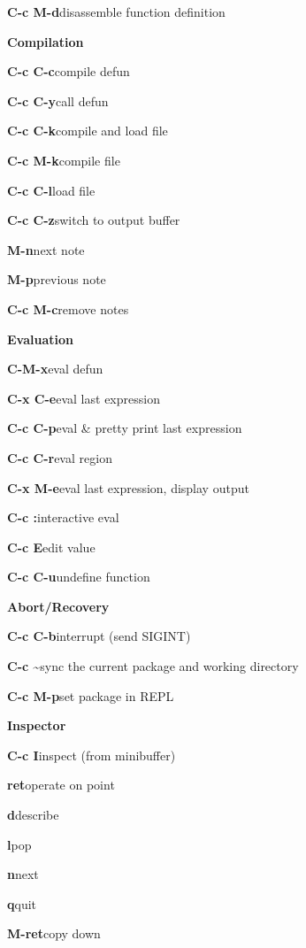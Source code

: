 \documentclass[a4paper,10pt]{article}
\newcommand{\group}[1]{\bigskip\par\noindent\textbf{\large#1}\medskip}
\newcommand{\key}[2]{\par\noindent\textbf{#1}\hfill{#2}}
\begin{document}
\key{C-c M-d}{disassemble function definition}

\group{Compilation}

\key{C-c C-c}{compile defun}
\key{C-c C-y}{call defun}
\key{C-c C-k}{compile and load file}
\key{C-c M-k}{compile file}
\key{C-c C-l}{load file}
\key{C-c C-z}{switch to output buffer}
\key{M-n}{next note}
\key{M-p}{previous note}
\key{C-c M-c}{remove notes}

\group{Evaluation}

\key{C-M-x}{eval defun}
\key{C-x C-e}{eval last expression}
\key{C-c C-p}{eval \& pretty print last expression}
\key{C-c C-r}{eval region}
\key{C-x M-e}{eval last expression, display output}
\key{C-c :}{interactive eval}
\key{C-c E}{edit value}
\key{C-c C-u}{undefine function}

\group{Abort/Recovery}

\key{C-c C-b}{interrupt (send SIGINT)}
\key{C-c \~}{sync the current package and working directory}
\key{C-c M-p}{set package in REPL}

\group{Inspector}

\key{C-c I}{inspect (from minibuffer)}
\key{ret}{operate on point}
\key{d}{describe}
\key{l}{pop}
\key{n}{next}
\key{q}{quit}
\key{M-ret}{copy down}
\end{document}

